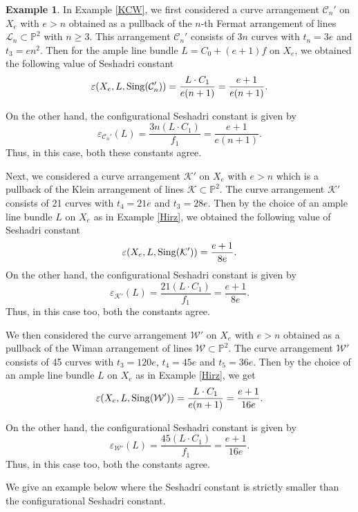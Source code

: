 \documentclass[12pt,reqno]{amsart}
\theoremstyle{plain}
\numberwithin{equation}{section}
\theoremstyle{definition}
\newtheorem{example}[theorem]{Example}
\begin{document}
	\begin{example}
		In Example \ref{KCW}, we first considered a curve arrangement  $\mathcal{C}_n'$ on $X_e$ with $e > n$ obtained as a pullback of the $n$-th Fermat arrangement of lines $\mathcal{L}_n \subset \mathbb{P}^2$  with $n \geq 3.$ This arrangement $\mathcal{C}_n'$ consists of $3n$ curves with $t_n=3e$ and $t_3=en^2.$ Then for the ample line bundle $L=C_0+(e+1)f $ on $X_e$, we obtained the following value of Seshadri constant 
		$$\varepsilon(X_e, L,{\rm Sing}(\mathcal{C}_n')) = \frac{L\cdot C_1}{e(n+1)}=\frac{e+1}{e(n+1)}.$$
		
		On the other hand, the configurational Seshadri constant is given by
		$$	\varepsilon_{\mathcal{C}_n'}(L)= \frac{3n(L\cdot C_1)}{f_1}= \frac{e+1}{e(n+1)}.$$
		Thus, in this case, both these constants agree.
		
		Next, we considered a curve arrangement  $\mathcal{K}'$ on $X_e$ with $e > n$ which is a pullback of the Klein arrangement of lines $\mathcal{K} \subset \mathbb{P}^2.$ The curve arrangement  $\mathcal{K}'$ consists of 21 curves with $t_4=21e$ and $t_3=28e.$ Then by the choice of an ample line bundle $L$ on $X_e$ as in Example \ref{Hirz}, we obtained the following value of Seshadri constant 
		$$\varepsilon(X_e, L,{\rm Sing}(\mathcal{K}')) = \frac{e+1}{8e}.$$
		On the other hand, the configurational Seshadri constant is given by
		$$	\varepsilon_{\mathcal{K}'}(L)= \frac{21(L\cdot C_1)}{f_1}= \frac{e+1}{8e}.$$
		Thus, in this case too, both the constants agree.
		
		We then considered the curve arrangement  $\mathcal{W}'$ on $X_e$ with $e > n$ obtained  as a pullback of the Wiman arrangement of lines $\mathcal{W} \subset \mathbb{P}^2$. The curve arrangement $\mathcal{W}'$ consists of 45 curves with $t_3=120e$, $t_4=45e$ and $t_5=36e.$ Then by the choice of an ample line bundle $L$ on $X_e$ as in Example \ref{Hirz}, we get
		$$\varepsilon(X_e, L,{\rm Sing}(\mathcal{W}')) = \frac{L\cdot C_1}{e(n+1)}=\frac{e+1}{16e}.$$
		
		On the other hand, the configurational Seshadri constant is given by
		$$	\varepsilon_{\mathcal{W}'}(L)= \frac{45(L\cdot C_1)}{f_1}= \frac{e+1}{16e}.$$
		Thus, in this case too, both the constants agree.
		
	\end{example}
We give an example below where the Seshadri constant is strictly smaller than the configurational Seshadri constant. 
\end{document}
